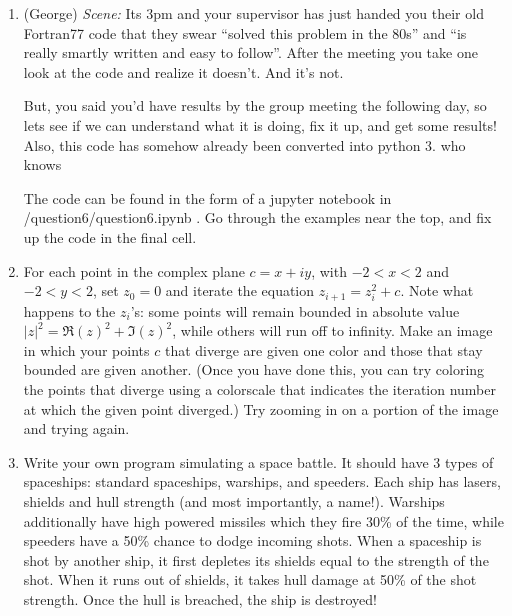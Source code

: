 \documentclass[]{article}
\begin{document}
\begin{enumerate}
\item (George) \textit{Scene:} Its 3pm and your supervisor has just handed you their old Fortran77 code that they swear ``solved this problem in the 80s'' and ``is really smartly written and easy to follow''. After the meeting you take one look at the code and realize it doesn't. And it's not. 

But, you said you'd have results by the group meeting the following day, so lets see if we can understand what it is doing, fix it up, and get some results! {\footnotesize{Also, this code has somehow already been converted into python 3. who knows}}

The code can be found in the form of a jupyter notebook in /question6/question6.ipynb . Go through the examples near the top, and fix up the code in the final cell.


\item 
For each point in the complex plane $c = x + iy$, with $-2 < x < 2$ and $-2 < y < 2$, set $z_0 = 0$ and iterate the equation $z_{i + 1} = z_i^2 + c$.  Note what happens to the $z_i$'s: some points will remain bounded in absolute value $|z|^2 = \Re(z)^2 + \Im(z)^2$, while others will run off to infinity.  Make an image  in which your points $c$ that diverge are given one color and those that stay bounded are given another.  (Once you have done this, you can try coloring the points that diverge using a colorscale that indicates the iteration number at which the given point diverged.)  Try zooming in on a portion of the image and trying again.  





\item Write your own program simulating a space battle. It should have 3 types of spaceships: standard spaceships, warships, and speeders. Each ship has lasers, shields and hull strength (and most importantly, a name!). Warships additionally have high powered missiles which they fire 30\% of the time, while speeders have a 50\% chance to dodge incoming shots. When a spaceship is shot by another ship, it first depletes its shields equal to the strength of the shot. When it runs out of shields, it takes hull damage at 50\% of the shot strength. Once the hull is breached, the ship is destroyed!


\end{enumerate}
\end{document}
